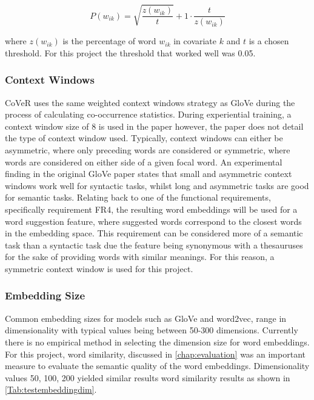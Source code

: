 \begin{equation}
P(w_{ik}) = \sqrt{\dfrac{z(w_{ik})}{t}} + 1 \cdot \dfrac{t}{z(w_{ik})}
\end{equation}

\noindent
\newline
where \(z(w_{ik})\) is the percentage of word \(w_{ik}\) in covariate \(k\) and \(t\) is a chosen threshold. For this project the threshold that worked well was 0.05.
\subsubsection{Context Windows}
CoVeR uses the same weighted context windows strategy as GloVe during the process of calculating co-occurrence statistics. During experiential training, a context window size of 8 is used in the paper however, the paper does not detail the type of context window used. Typically, context windows can either be asymmetric, where only preceding words are considered or symmetric, where words are considered on either side of a given focal word. An experimental finding in the original GloVe paper states that small and asymmetric context windows work well for syntactic tasks, whilst long and asymmetric tasks are good for semantic tasks. Relating back to one of the functional requirements, specifically requirement FR4, the resulting word embeddings will be used for a word suggestion feature, where suggested words correspond to the closest words in the embedding space. This requirement can be considered more of a semantic task than a syntactic task due the feature being synonymous with a thesauruses for the sake of providing words with similar meanings. For this reason, a symmetric context window is used for this project.
\subsubsection{Embedding Size}
Common embedding sizes for models such as GloVe and word2vec, range in dimensionality with typical values being between 50-300 dimensions. Currently there is no empirical method in selecting the dimension size for word embeddings. For this project, word similarity, discussed in \autoref{chap:evaluation} was an important measure to evaluate the semantic quality of the word embeddings. Dimensionality values 50, 100, 200 yielded similar results word similarity results as shown in \autoref{Tab:testembeddingdim}.

